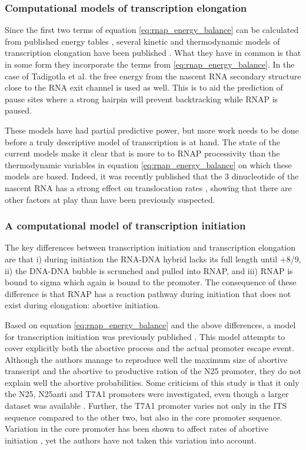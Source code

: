 \subsubsection{Computational models of transcription elongation}
Since the first two terms of equation \eqref{eq:rnap_energy_balance} can be
calculated from published energy tables \cite{wu_temperature_2002, 
santalucia_thermodynamics_2004}, several kinetic and thermodynamic models
of transcription elongation have been published
\cite{tadigotla_thermodynamic_2006-1, bai_sequence-dependent_2004,
guajardo_model_1997}. What they have in common is that in some form they
incorporate the terms from \eqref{eq:rnap_energy_balance}. In the case of
Tadigotla et al. \cite{tadigotla_thermodynamic_2006-1} the free energy from the
nascent RNA secondary structure close to the RNA exit channel is used as well.
This is to aid the prediction of pause sites where a strong hairpin will
prevent backtracking while RNAP is paused.

These models have had partial predictive power, but more work needs to be done
before a truly descriptive model of transcription is at hand. The state of the
current models make it clear that is more to to RNAP processivity than the
thermodynamic variables in equation \eqref{eq:rnap_energy_balance} on which
these models are based. Indeed, it was recently published that the 3\p
dinucleotide of the nascent RNA has a strong effect on translocation rates
\cite{hein_rna_2011}, showing that there are other factors at play than have
been previously suspected.

\subsubsection{A computational model of transcription initiation}
The key differences between transcription initiation and transcription
elongation are that i) during initiation the RNA-DNA hybrid lacks its full
length until +8/9, ii) the DNA-DNA bubble is scrunched and pulled into RNAP,
and iii) RNAP is bound to sigma which again is bound to the promoter. The
consequence of these difference is that RNAP has a reaction pathway during
initiation that does not exist during elongation: abortive initiation.

Based on equation \eqref{eq:rnap_energy_balance} and the above differences, a
model for transcription initiation was previously published
\cite{xue_kinetic_2008}. This model attempts to cover explicitly both the
abortive process and the actual promoter escape event. Although the authors
manage to reproduce well the maximum size of abortive transcript and the
abortive to productive ration of the N25 promoter, they do not explain well the
abortive probabilities. Some criticism of this study is that it only the N25,
N25anti and T7A1 promoters were investigated, even though a larger dataset was
available \cite{hsu_initial_2006}. Further, the T7A1 promoter varies not only
in the ITS sequence compared to the other two, but also in the core promoter
sequence. Variation in the core promoter has been shown to affect rates of
abortive initiation \cite{vo_vitro_2003-1}, yet the authors have not taken
this variation into account.
